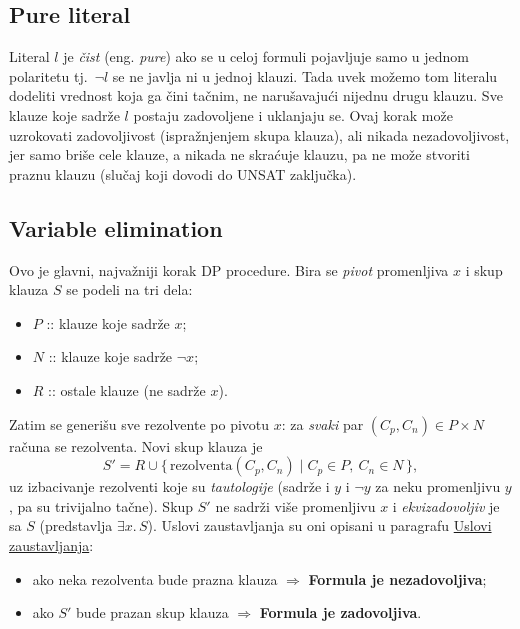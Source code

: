 \documentclass[a4paper,10pt]{article}
\begin{document}
\subsection{Pure literal}
Literal $l$ je \emph{čist} (eng. \emph{pure}) ako se u celoj formuli pojavljuje samo u jednom polaritetu tj.\ $\neg l$ se ne javlja ni u jednoj klauzi. Tada uvek možemo tom literalu dodeliti vrednost koja ga čini tačnim, ne narušavajući nijednu drugu klauzu. Sve klauze koje sadrže $l$ postaju zadovoljene i uklanjaju se. Ovaj korak može uzrokovati zadovoljivost (ispražnjenjem skupa klauza), ali nikada nezadovoljivost, jer samo briše cele klauze, a nikada ne skraćuje klauzu, pa ne može stvoriti praznu klauzu (slučaj koji dovodi do UNSAT zaključka).

\subsection{Variable elimination}

Ovo je glavni, najvažniji korak DP procedure. Bira se \emph{pivot} promenljiva $x$ i skup klauza $S$ se podeli na tri dela:
\begin{itemize}
  \item $P$ :: klauze koje sadrže $x$;
  \item $N$ :: klauze koje sadrže $\neg x$;
  \item $R$ :: ostale klauze (ne sadrže $x$).
\end{itemize}
Zatim se generišu sve rezolvente po pivotu $x$: za \emph{svaki} par $(C_p, C_n) \in P \times N$ računa se rezolventa. Novi skup klauza je
\[
  S' = R \cup \{\, \text{rezolventa}(C_p, C_n) \mid C_p \in P,\ C_n \in N \,\},
\]
uz izbacivanje rezolventi koje su \emph{tautologije} (sadrže i $y$ i $\neg y$ za neku promenljivu $y$, pa su trivijalno tačne). Skup $S'$ ne sadrži više promenljivu $x$ i \emph{ekvizadovoljiv} je sa $S$ (predstavlja $\exists x.\, S$). Uslovi zaustavljanja su oni opisani u paragrafu \hyperref[par:uslovi_zaustavljanja]{Uslovi zaustavljanja}:
\begin{itemize}
  \item ako neka rezolventa bude prazna klauza $\Rightarrow$ \textbf{Formula je nezadovoljiva};
  \item ako $S'$ bude prazan skup klauza $\Rightarrow$ \textbf{Formula je zadovoljiva}.
\end{itemize}
\end{document}
